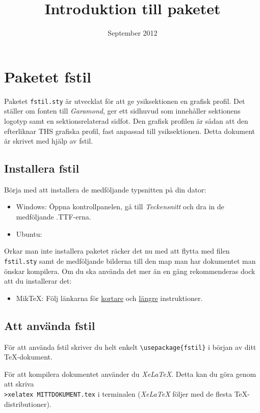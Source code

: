 \documentclass[a4paper]{article}
\title{Introduktion till paketet  \NoCaseChange{\texttt{fstil.sty}} }
\date{September 2012}
\author{}
\newcommand{\bs}{\textbackslash}
\begin{document}
\ftitlepage
\ftoc
\section{Paketet fstil}
Paketet \texttt{fstil.sty} är utvecklat för att ge \F ysiksektionen en grafisk profil. Det ställer om fonten till \textit{Garamond}, ger ett sidhuvud som innehåller sektionens logotyp samt en sektionsrelaterad sidfot. Den grafisk profilen är sådan att den efterliknar THS grafiska profil, fast anpassad till \F ysiksektionen. Detta dokument är skrivet med hjälp av fstil.

\subsection{Installera fstil}
Börja med att installera de medföljande typsnitten på din dator:
\begin{itemize}
\item[] Windows: Öppna kontrollpanelen, gå till \textit{Teckensnitt} och dra in de medföljande .TTF-erna.
\item[] Ubuntu:
\end{itemize}

Orkar man inte installera paketet räcker det nu med att flytta med filen \texttt{fstil.sty} samt de medföljande bilderna till den map man har dokumentet man önskar kompilera. Om du ska använda det mer än en gång rekommenderas dock att du installerar det:
\begin{itemize}
\item[] MikTeX: Följ länkarna för \href{http://docs.miktex.org/faq/maintenance.html#styfiles}{kortare} och \href{http://docs.miktex.org/manual/localadditions.html}{längre} instruktioner.
\end{itemize}

\subsection{Att använda fstil}
För att använda fstil skriver du helt enkelt \texttt{\bs usepackage\{fstil\}} i början av ditt \TeX-dokument.

För att kompilera dokumentet använder du \textit{XeLaTeX}. Detta kan du göra genom att skriva \\ \texttt{>xelatex MITTDOKUMENT.tex} i terminalen (\textit{XeLaTeX} följer med de flesta \TeX-distributioner).
\end{document}
